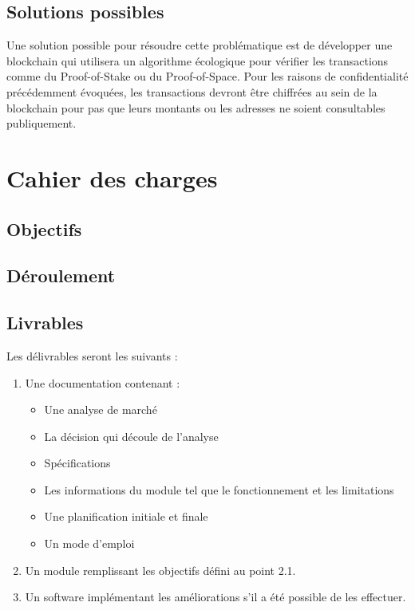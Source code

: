 \subsection*{Solutions possibles}

Une solution possible pour résoudre cette problématique est de développer une blockchain qui utilisera un algorithme écologique pour vérifier les transactions comme du Proof-of-Stake ou du Proof-of-Space. Pour les raisons de confidentialité précédemment évoquées, les transactions devront être chiffrées au sein de la blockchain pour pas que leurs montants ou les adresses ne soient consultables publiquement.

\section*{Cahier des charges}
\lipsum[1-1]


\subsection*{Objectifs}
\lipsum[1-1]

\subsection*{Déroulement}

\subsection*{Livrables}
Les délivrables seront les suivants :
\begin{enumerate}
\item Une documentation contenant :
	\begin{itemize}
	\item Une analyse de marché
	\item La décision qui découle de l’analyse
	\item Spécifications
	\item Les informations du module tel que le fonctionnement et les limitations 
	\item Une planification initiale et finale
	\item Un mode d’emploi
	\end{itemize}
\item Un module remplissant les objectifs défini au point 2.1.
\item Un software implémentant les améliorations s’il a été possible de les effectuer.
\end{enumerate}
